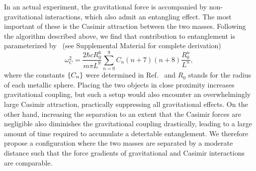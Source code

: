 \documentclass[aps,prd,reprint,superscriptaddress,nofootinbib,floatfix]{revtex4-2}
\begin{document}
In an actual experiment, the gravitational force is accompanied by non-gravitational interactions, which also admit an entangling effect. The most important of these is the Casimir attraction between the two masses. Following the algorithm described above, we find that contribution to entanglement is parameterized by~\cite{Casimir-Emig2007,PhysRev.73.360} (see Supplemental Material for complete derivation)
\begin{equation}
\omega_{C}^2 = \frac{2\hbar c R_0^6}{m\pi L^9} \sum_{n=0}^{9} C_n (n+7)(n+8) \frac{R_0^n}{L^n},
\end{equation}
where the constants $\qty{C_n}$ were determined in Ref.~\cite{Casimir-Emig2007} and $R_0$ stands for the radius of each metallic sphere.
Placing the two objects in close proximity increases gravitational coupling, but such a setup would also encounter an overwhelmingly large Casimir attraction, practically suppressing all gravitational effects.
On the other hand, increasing the separation to an extent that the Casimir forces are negligible also diminishes the gravitational coupling drastically, leading to a large amount of time required to accumulate a detectable entanglement.
We therefore propose a configuration where the two masses are separated by a moderate distance such that the force gradients of gravitational and Casimir interactions are comparable. 
\end{document}
